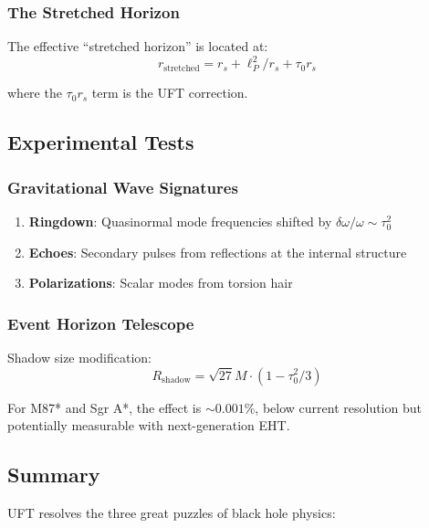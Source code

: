 \subsubsection{The Stretched Horizon}

The effective ``stretched horizon'' is located at:
\begin{equation}
    r_{\text{stretched}} = r_s + \ell_P^2/r_s + \tau_0 r_s
\end{equation}

where the $\tau_0 r_s$ term is the UFT correction.

\subsection{Experimental Tests}

\subsubsection{Gravitational Wave Signatures}

\begin{enumerate}
    \item \textbf{Ringdown}: Quasinormal mode frequencies shifted by $\delta\omega/\omega \sim \tau_0^2$
    \item \textbf{Echoes}: Secondary pulses from reflections at the internal structure
    \item \textbf{Polarizations}: Scalar modes from torsion hair
\end{enumerate}

\subsubsection{Event Horizon Telescope}

Shadow size modification:
\begin{equation}
    R_{\text{shadow}} = \sqrt{27}M \cdot (1 - \tau_0^2/3)
\end{equation}

For M87* and Sgr A*, the effect is $\sim 0.001\%$, below current resolution but potentially measurable with next-generation EHT.

\subsection{Summary}

UFT resolves the three great puzzles of black hole physics:

